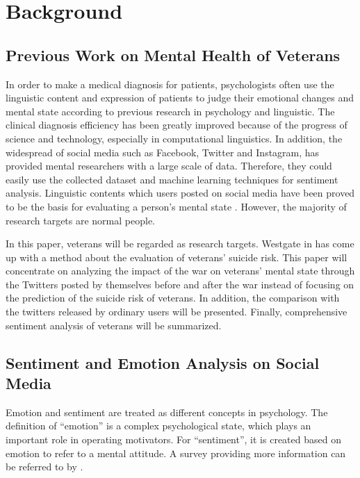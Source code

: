 \section{Background}

\subsection{Previous Work on Mental Health of Veterans}

In order to make a medical diagnosis for patients, psychologists often use the
linguistic content and expression of patients to judge their emotional changes
and mental state according to previous research in psychology and linguistic.
The clinical diagnosis efficiency has been greatly improved because of the
progress of science and technology, especially in computational linguistics.
In addition, the widespread of social media such as Facebook, Twitter and
Instagram, has provided mental researchers with a large scale of data.
Therefore, they could easily use the collected dataset and machine learning
techniques for sentiment analysis. Linguistic contents which users posted on
social media have been proved to be the basis for evaluating a person's mental
state \citep{becauseIwastoldsomuch} \citep{GUNTUKU201743}. However,
the majority of research targets are normal people.

In this paper, veterans will be regarded as research targets. Westgate in
\citep{doi:10.1176/appi.ps.201400283} has come up with a method about the evaluation
of veterans' suicide risk. This paper will concentrate on analyzing
the impact of the war on veterans' mental state through the Twitters posted by
themselves before and after the war instead of focusing on the prediction of
the suicide risk of veterans. In addition, the comparison with the twitters
released by ordinary users will be presented. Finally, comprehensive
sentiment analysis of veterans will be summarized.

\subsection{Sentiment and Emotion Analysis on Social Media}

Emotion and sentiment are treated as different concepts in psychology. The
definition of \enquote{emotion} is a complex psychological state, which plays an
important role in operating motivators. For \enquote{sentiment}, it is created based on
emotion to refer to a mental attitude. A survey providing more information can
be referred to by \citep{yue2018survey}.

